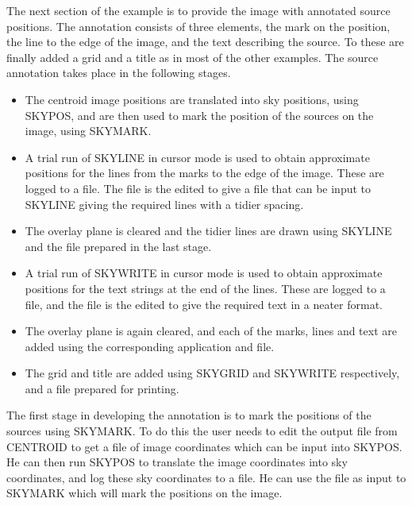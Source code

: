 \documentclass[twoside,11pt]{starlink}
\begin{document}
The next section of the example is to provide the image with annotated source
positions. The annotation consists of three elements, the mark on the position,
the line to the edge of the image, and the text describing the source. To these
are finally added a grid and a title as in most of the other examples.
The source annotation takes place in the following stages.
\begin{itemize}
\item The centroid image positions are translated into sky positions, using
SKYPOS, and are then used to mark the position of the sources on the image,
using SKYMARK.
\item A trial run of SKYLINE in cursor mode is used to obtain approximate
positions for the lines from the marks to the edge of the image. These are
logged to a file. The file is the edited to give a file that can be input
to SKYLINE giving the required lines with a tidier spacing.
\item The overlay plane is cleared and the tidier lines are drawn using
SKYLINE and the file prepared in the last stage.
\item A trial run of SKYWRITE in cursor mode is used to obtain approximate
positions for the text strings at the end of the lines. These are logged to
a file, and the file is the edited to give the required text in a neater format.
\item The overlay plane is again cleared, and each of the marks, lines and text
are added using the corresponding application and file.
\item The grid and title are added using SKYGRID and SKYWRITE respectively, and
a file prepared for printing.
\end{itemize}

The first stage in developing the annotation is to mark the positions of the
sources using SKYMARK. To do this the user needs to edit the output file from
CENTROID to get a file of image coordinates which can be input into SKYPOS.
He can then run SKYPOS to translate the image coordinates into sky coordinates,
and log these sky coordinates to a file. He can use the file as input to SKYMARK
which will mark the positions on the image.
\end{document}
